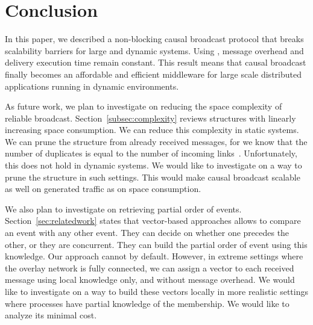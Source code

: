 
\section{Conclusion}
\label{sec:conclusion}

In this paper, we described a non-blocking causal broadcast protocol that breaks
scalability barriers for large and dynamic systems. Using \CBROADCAST, message
overhead and delivery execution time remain constant.
This result means that causal broadcast finally becomes an affordable and
efficient middleware for large scale distributed applications running in dynamic
environments.

As future work, we plan to investigate on reducing the space complexity of
reliable broadcast. Section~\ref{subsec:complexity} reviews structures with
linearly increasing space consumption. We can reduce this complexity in static
systems. We can prune the structure from already received messages, for we know
that the number of duplicates is equal to the number of incoming
links~\cite{raynal2013distributed}. Unfortunately, this does not hold in dynamic
systems. We would like to investigate on a way to prune the structure in such
settings. This would make causal broadcast scalable as well on generated traffic
as on space consumption.

We also plan to investigate on retrieving partial order of
events. Section~\ref{sec:relatedwork} states that vector-based approaches allows
to compare an event with any other event. They can decide on whether one
precedes the other, or they are concurrent. They can build the partial order of
event using this knowledge. Our approach cannot by default. However, in extreme
settings where the overlay network is fully connected, we can assign a vector to
each received message using local knowledge only, and without message
overhead. We would like to investigate on a way to build these vectors locally
in more realistic settings where processes have partial knowledge of the
membership. We would like to analyze its minimal cost.

